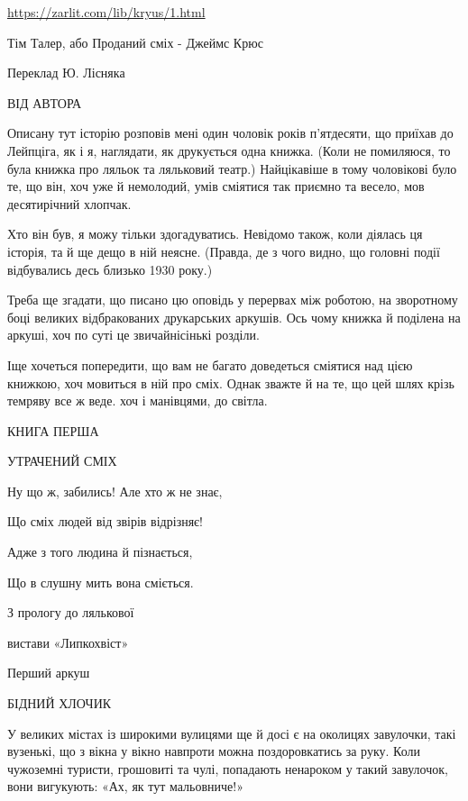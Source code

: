  
 
 
 
 


\url{https://zarlit.com/lib/kryus/1.html}

Тім Талер, або Проданий сміх - Джеймс Крюс

Переклад Ю. Лісняка

ВІД АВТОРА

Описану тут історію розповів мені один чоловік років п'ятдесяти, що приїхав до
Лейпціга, як і я, наглядати, як друкується одна книжка. (Коли не помиляюся, то
була книжка про ляльок та ляльковий театр.) Найцікавіше в тому чоловікові було
те, що він, хоч уже й немолодий, умів сміятися так приємно та весело, мов
десятирічний хлопчак.

Хто він був, я можу тільки здогадуватись. Невідомо також, коли діялась ця
історія, та й ще дещо в ній неясне. (Правда, де з чого видно, що головні події
відбувались десь близько 1930 року.)

Треба ще згадати, що писано цю оповідь у перервах між роботою, на зворотному
боці великих відбракованих друкарських аркушів. Ось чому книжка й поділена на
аркуші, хоч по суті це звичайнісінькі розділи.

Іще хочеться попередити, що вам не багато доведеться сміятися над цією книжкою,
хоч мовиться в ній про сміх. Однак зважте й на те, що цей шлях крізь темряву
все ж веде. хоч і манівцями, до світла.

КНИГА ПЕРША

УТРАЧЕНИЙ СМІХ

Ну що ж, забились! Але хто ж не знає,

Що сміх людей від звірів відрізняє!

Адже з того людина й пізнається,

Що в слушну мить вона сміється.

З прологу до лялькової

вистави «Липкохвіст»

Перший аркуш

БІДНИЙ ХЛОЧИК

У великих містах із широкими вулицями ще й досі є на околицях завулочки, такі вузенькі, що з вікна у вікно навпроти можна поздоровкатись за руку. Коли чужоземні туристи, грошовиті та чулі, попадають ненароком у такий завулочок, вони вигукують: «Ах, як тут мальовниче!»

